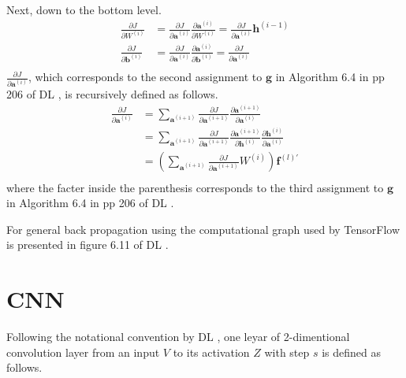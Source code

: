 \documentclass[a4]{article}
\begin{document}
Next, down to the bottom level.
\begin{equation}
\begin{aligned}
\frac{ \partial J } { \partial W^{(i)} } &= 
\frac{ \partial J } { \partial \bm{a}^{(i)} }
\frac{ \partial \bm{a}^{(i)} }{ \partial W^{(i)} } = 
\frac{ \partial J } { \partial \bm{a}^{(i)} }
\bm{h}^{(i-1)}\\
\frac{ \partial J } { \partial \bm{b}^{(i)} } &= 
\frac{ \partial J } { \partial \bm{a}^{(i)} }
\frac{ \partial \bm{a}^{(i)} }{ \partial \bm{b}^{(i)} } = 
\frac{ \partial J } { \partial \bm{a}^{(i)} }\\
\end{aligned}
\end{equation}
$\frac{ \partial J } { \partial \bm{a}^{(i)} }$, which corresponds to the second assignment to
$\bm{g}$ in Algorithm 6.4 in pp 206 of DL \cite{GoodBengCour16}, is recursively defined as follows.
\begin{equation}
\begin{aligned}
\frac{ \partial J } { \partial \bm{a}^{(i)} } &= 
\sum_{ \bm{a}^{(i+1)} }
\frac{ \partial J } { \partial \bm{a}^{(i+1)} }
\frac{ \partial \bm{a}^{(i+1)} }{ \partial \bm{a}^{(i)} }\\
&=\sum_{ \bm{a}^{(i+1)} }
\frac{ \partial J } { \partial \bm{a}^{(i+1)} }
\frac{ \partial \bm{a}^{(i+1)} }{ \partial \bm{h}^{(i)} }
\frac{ \partial \bm{h}^{(i)} }{ \partial \bm{a}^{(i)} }\\
&=\left(\sum_{ \bm{a}^{(i+1)} }
\frac{ \partial J } { \partial \bm{a}^{(i+1)} }
W^{(i)}\right)
\bm{f}^{(l)'}\label{eq:dnn_g(2)}\\
\end{aligned}
\end{equation}
where the facter inside the parenthesis corresponds to the third assignment to
$\bm{g}$ in Algorithm 6.4 in pp 206 of  DL \cite{GoodBengCour16}.

For general back propagation using the computational graph used by TensorFlow 
is presented in figure 6.11 of DL \cite{GoodBengCour16}.


\section{CNN}
Following the notational convention by DL \cite{GoodBengCour16}, one leyar of 2-dimentional
convolution layer from an input $V$ to its activation $Z$ with step $s$ is defined as follows.
\end{document}
